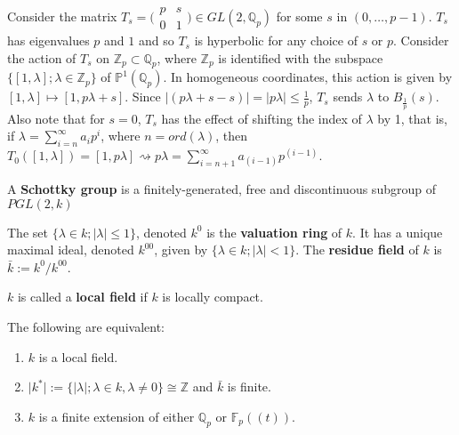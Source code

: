\begin{example} 
Consider the matrix $T_s =  \bigl( \begin{smallmatrix}p & s\\ 0 & 1 \end{smallmatrix}\bigr) \in GL(2, \mathbb{Q}_p)$ for some $s$ in $(0,\ldots, p-1)$. $T_s$ has eigenvalues $p$ and $1$ and so $T_s$ is hyperbolic for any choice of $s$ or $p$. Consider the action of $T_s$ on $\mathbb{Z}_p \subset \mathbb{Q}_p$, where $\mathbb{Z}_p$ is identified with the subspace $\{[1,\lambda];\lambda \in \mathbb{Z}_p \}$ of $\mathbb{P}^1(\mathbb{Q}_p)$. In homogeneous coordinates, this action is given by $[1,\lambda] \mapsto [1, p\lambda +s]$. Since $\mid (p\lambda +s -s)\mid = \mid p\lambda\mid \leq \frac{1}{p}$, $T_s$ sends $\lambda$ to $B_\frac{1}{p}(s)$. Also note that for $s = 0$, $T_s$ has the effect of shifting the index of $\lambda$ by 1, that is, if $\lambda = \sum_{i=n}^\infty a_ip^i$, where $n = ord(\lambda)$, then $T_0([1,\lambda]) = [1, p\lambda] \rightsquigarrow p\lambda = \sum_{i=n+1}^\infty a_{(i-1)}p^{(i-1)}$.	
\end{example}	

\begin{definition*} \cite{gvdp} A \textbf{Schottky group} is a finitely-generated, free and discontinuous subgroup of  $PGL(2,k)$
\end{definition*}

\begin{definition*}\cite{gvdp}
The set $\{\lambda \in k; \mid \lambda\mid \leq 1\}$, denoted $k^0$ is the \textbf{valuation ring} of $k$. It has a unique maximal ideal, denoted $k^{00}$, given by $\{\lambda \in k; \mid \lambda\mid < 1\}$. The \textbf{residue field} of $k$ is $\bar{k} := k^0/k^{00}$.
\end{definition*}

\begin{definition*} $k$ is called a \textbf{local field} if $k$ is locally compact. \end{definition*}

\begin{proposition*} \cite{gvdp} The following are equivalent:
\begin{enumerate}
\item $k$ is a local field.
\item $\mid k^*\mid := \{\mid \lambda\mid; \lambda \in k, \lambda \neq 0\} \cong \mathbb{Z}$ and $\bar{k}$ is finite.
\item $k$ is a finite extension of either $\mathbb{Q}_p$ or $\mathbb{F}_p((t))$.
\end{enumerate}
\end{proposition*}	

